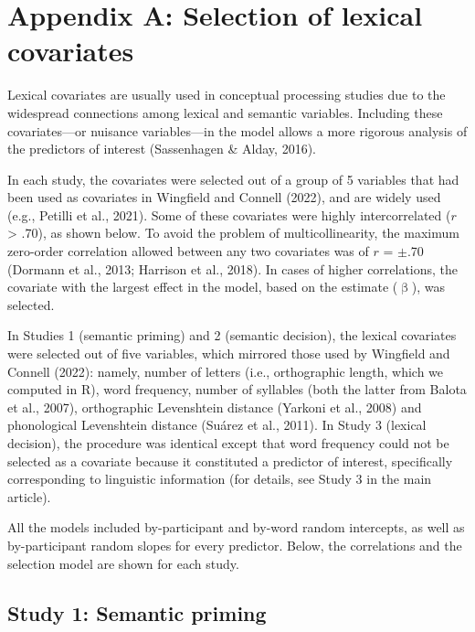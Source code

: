 \documentclass[
  12pt,
  man,floatsintext]{apa7}
\begin{document}
\hypertarget{appendix-A-lexical-covariates}{%
\section{Appendix A: Selection of lexical covariates}\label{appendix-A-lexical-covariates}}

Lexical covariates are usually used in conceptual processing studies due to the widespread connections among lexical and semantic variables. Including these covariates---or nuisance variables---in the model allows a more rigorous analysis of the predictors of interest (Sassenhagen \& Alday, 2016).

In each study, the covariates were selected out of a group of 5 variables that had been used as covariates in Wingfield and Connell (2022), and are widely used (e.g., Petilli et al., 2021). Some of these covariates were highly intercorrelated (\(r\) \textgreater{} .70), as shown below. To avoid the problem of multicollinearity, the maximum zero-order correlation allowed between any two covariates was of \(r\) = \(\pm\).70 (Dormann et al., 2013; Harrison et al., 2018). In cases of higher correlations, the covariate with the largest effect in the model, based on the estimate (\(\upbeta\)), was selected.

In Studies 1 (semantic priming) and 2 (semantic decision), the lexical covariates were selected out of five variables, which mirrored those used by Wingfield and Connell (2022): namely, number of letters (i.e., orthographic length, which we computed in R), word frequency, number of syllables (both the latter from Balota et al., 2007), orthographic Levenshtein distance (Yarkoni et al., 2008) and phonological Levenshtein distance (Suárez et al., 2011). In Study 3 (lexical decision), the procedure was identical except that word frequency could not be selected as a covariate because it constituted a predictor of interest, specifically corresponding to linguistic information (for details, see Study 3 in the main article).

All the models included by-participant and by-word random intercepts, as well as by-participant random slopes for every predictor. Below, the correlations and the selection model are shown for each study.

\hypertarget{study-1-semantic-priming-1}{%
\subsection{Study 1: Semantic priming}\label{study-1-semantic-priming-1}}
\end{document}
